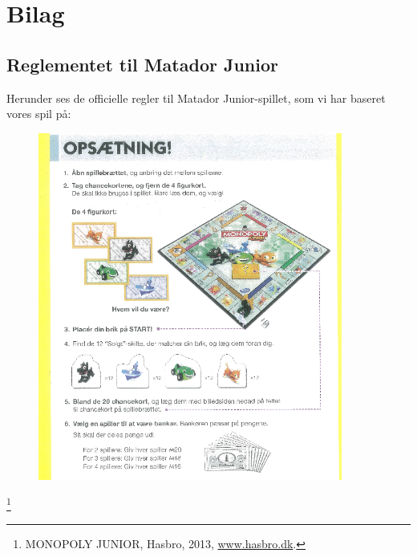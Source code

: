 \chapter{Bilag}

\section{Reglementet til Matador Junior}
Herunder ses de officielle regler til Matador Junior-spillet, som vi har baseret vores spil på:\\
\begin{figure}[H]
    \begin{center}
        \includegraphics[width=10cm]{graphics/rules/Rules1.png}
    \end{center}
\end{figure}
\footnote{MONOPOLY JUNIOR, Hasbro, 2013, \href{https://www.hasbro.dk}{www.hasbro.dk}.}
\pagebreak

